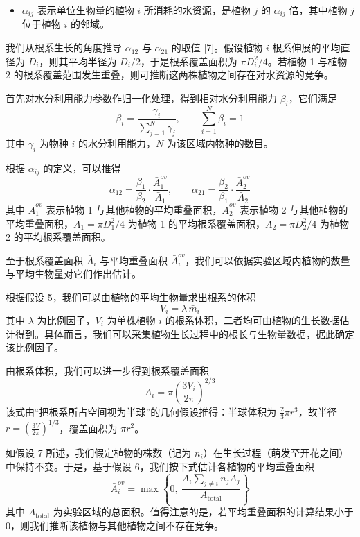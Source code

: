 \documentclass[11pt,a4paper]{ctexart}
\begin{document}
\begin{itemize}
\item $\alpha_{ij}$ 表示单位生物量的植物 $i$ 所消耗的水资源，是植物 $j$ 的 $\alpha_{ij}$ 倍，其中植物 $j$ 位于植物 $i$ 的邻域。
\end{itemize}

我们从根系生长的角度推导 $\alpha_{12}$ 与 $\alpha_{21}$ 的取值 [7]。假设植物 $i$ 根系伸展的平均直径为 $D_i$，则其平均半径为 $D_i/2$，于是根系覆盖面积为 $\pi D_i^{2}/4$。若植物 1 与植物 2 的根系覆盖范围发生重叠，则可推断这两株植物之间存在对水资源的竞争。

首先对水分利用能力参数作归一化处理，得到相对水分利用能力 $\beta_i$，它们满足
\[
\beta_i=\frac{\gamma_i}{\sum_{j=1}^{N}\gamma_j},\qquad \sum_{i=1}^{N}\beta_i=1
\]
其中 $\gamma_i$ 为物种 $i$ 的水分利用能力，$N$ 为该区域内物种的数目。

根据 $\alpha_{ij}$ 的定义，可以推得
\[
\alpha_{12}=\frac{\beta_1}{\beta_2}\cdot\frac{\bar A_1^{ov}}{\bar A_1},\qquad
\alpha_{21}=\frac{\beta_2}{\beta_1}\cdot\frac{\bar A_2^{ov}}{\bar A_2}
\]
其中 $\bar A_1^{ov}$ 表示植物 1 与其他植物的平均重叠面积，$\bar A_2^{ov}$ 表示植物 2 与其他植物的平均重叠面积，$\bar A_1=\pi D_1^{2}/4$ 为植物 1 的平均根系覆盖面积，$\bar A_2=\pi D_2^{2}/4$ 为植物 2 的平均根系覆盖面积。

至于根系覆盖面积 $\bar A_i$ 与平均重叠面积 $\bar A_i^{ov}$，我们可以依据实验区域内植物的数量与平均生物量对它们作出估计。

根据假设 5，我们可以由植物的平均生物量求出根系的体积
\[
V_i=\lambda\,\bar m_i
\]
其中 $\lambda$ 为比例因子，$V_i$ 为单株植物 $i$ 的根系体积，二者均可由植物的生长数据估计得到。具体而言，我们可以采集植物生长过程中的根长与生物量数据，据此确定该比例因子。

由根系体积，我们可以进一步得到根系覆盖面积
\[
A_i=\pi\left(\frac{3V_i}{2\pi}\right)^{2/3}
\]
该式由“把根系所占空间视为半球”的几何假设推得：半球体积为 $\frac{2}{3}\pi r^{3}$，故半径 $r=\left(\frac{3V}{2\pi}\right)^{1/3}$，覆盖面积为 $\pi r^{2}$。

如假设 7 所述，我们假定植物的株数（记为 $n_i$）在生长过程（萌发至开花之间）中保持不变。于是，基于假设 6，我们按下式估计各植物的平均重叠面积
\[
\bar A_i^{ov}=\max\left\{0,\ \frac{A_i\displaystyle\sum_{j\neq i}n_jA_j}{A_{\mathrm{total}}}\right\}
\]
其中 $A_{\mathrm{total}}$ 为实验区域的总面积。值得注意的是，若平均重叠面积的计算结果小于 0，则我们推断该植物与其他植物之间不存在竞争。
\end{document}
